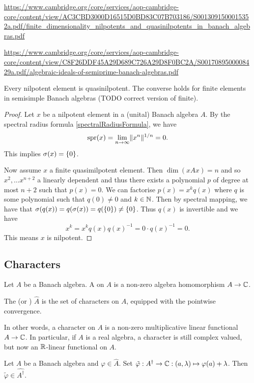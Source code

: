 \url{https://www.cambridge.org/core/services/aop-cambridge-core/content/view/AC3CBD3000D16515D0BD83C07B703186/S0013091500015352a.pdf/finite_dimensionality_nilpotents_and_quasinilpotents_in_banach_algebras.pdf}

\url{https://www.cambridge.org/core/services/aop-cambridge-core/content/view/C8F26DDF45A29D689C726A29D8F0BC2A/S0017089500008429a.pdf/algebraic-ideals-of-semiprime-banach-algebras.pdf}

\begin{proposition} \label{nilpotentQuasinilpotent}
Every nilpotent element is quasinilpotent. The converse holds for finite elements in semisimple Banach algebras (TODO correct version of finite).
\end{proposition}
\begin{proof}
Let $x$ be a nilpotent element in a (unital) Banach algebra $A$.
By the spectral radius formula \ref{spectralRadiusFormula}, we have
\[ \operatorname{spr}(x) = \lim_{n\to\infty}\lVert x^n\rVert^{1/n} = 0. \]
This implies $\sigma(x) = \{0\}$.

Now assume $x$ a finite quasimilpotent element. Then $\dim(xAx) = n$ and so $x^2, \ldots x^{n+2}$ a linearly dependent and thus there exists a polynomial $p$ of degree at most $n+2$ such that $p(x) = 0$. We can factorise $p(x) = x^kq(x)$ where $q$ is some polynomial such that $q(0) \neq 0$ and $k\in \mathbb{N}$. Then by spectral mapping, we have that $\sigma(q(x)) = q(\sigma(x)) = q(\{0\}) \neq \{0\}$. Thus $q(x)$ is invertible and we have
\[ x^k = x^kq(x)q(x)^{-1} = 0\cdot q(x)^{-1} = 0. \]
This means $x$ is nilpotent.
\end{proof}

\subsection{Characters}
\begin{definition}
Let $A$ be a Banach algebra. A  on $A$ is a non-zero algebra homomorphism $A\to\mathbb{C}$.

The  (or ) $\hat{A}$ is the set of characters on $A$, equipped with the pointwise convergence.
\end{definition}
In other words, a character on $A$ is a non-zero multiplicative linear functional $A\to \mathbb{C}$.
In particular, if $A$ is a real algebra, a character is still complex valued, but now  an $\mathbb{R}$-linear functional on $A$. 

\begin{lemma} \label{unitalCharacterExtension}
Let $A$ be a Banach algebra and $\varphi\in \hat{A}$. Set $\tilde{\varphi}: A^\dagger \to \mathbb{C}: (a,\lambda) \mapsto \varphi(a)+\lambda$. Then $\tilde{\varphi} \in \widehat{A^\dagger}$.
\end{lemma}


